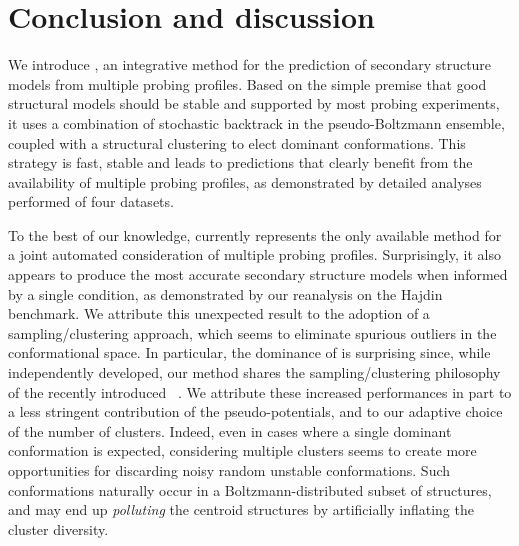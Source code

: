 \documentclass[a4,center,fleqn]{NAR}
\begin{document}










\section*{Conclusion and discussion}

We introduce \OurTool{}, an integrative method for the prediction of secondary structure models from multiple probing profiles. Based on the simple premise that good structural models should be stable and supported by most probing experiments, it uses a combination of stochastic backtrack in the pseudo-Boltzmann ensemble, coupled with a structural clustering to elect dominant conformations. This strategy is fast, stable and leads to predictions that clearly benefit from the availability of multiple probing profiles, as demonstrated by detailed analyses performed of four datasets. 


To the best of our knowledge, \OurTool currently represents the only available method for a joint automated consideration of multiple probing profiles. Surprisingly, it also appears to produce the most accurate secondary structure models when informed by a single condition, as demonstrated by our reanalysis on the Hajdin\etal\cite{Hajdin2013} benchmark. We attribute this unexpected result to the adoption of a sampling/clustering approach, which seems to eliminate spurious outliers in the conformational space. In particular, the dominance of \OurTool is surprising since, while independently developed, our method shares the sampling/clustering philosophy of the recently introduced ~\cite{Spasic2017}. We attribute these increased performances in part to a less stringent contribution of the pseudo-potentials, and to our adaptive choice of the number of clusters. Indeed, even in cases where a single dominant conformation is expected, considering multiple clusters seems to create more opportunities for discarding noisy random unstable conformations. Such conformations naturally occur in a Boltzmann-distributed subset of structures, and may end up \emph{polluting} the centroid structures by artificially inflating the cluster diversity. 
\end{document}
